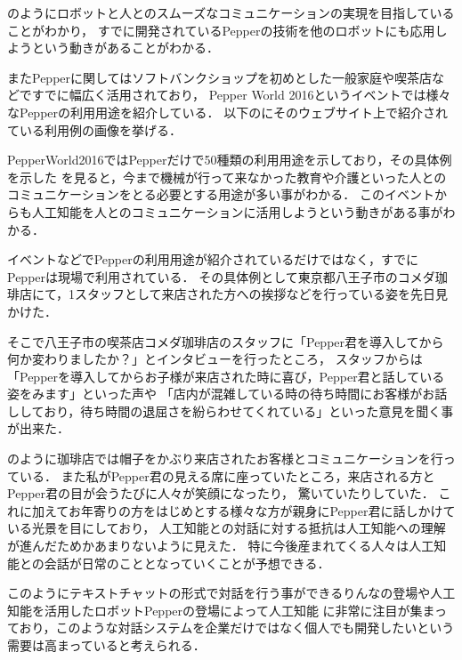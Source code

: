 
のようにロボットと人とのスムーズなコミュニケーションの実現を目指していることがわかり，
すでに開発されているPepperの技術を他のロボットにも応用しようという動きがあることがわかる．

またPepperに関してはソフトバンクショップを初めとした一般家庭や喫茶店などですでに幅広く活用されており，
Pepper World 2016\cite{Pepper2}というイベントでは様々なPepperの利用用途を紹介している．
以下のにそのウェブサイト上で紹介されている利用例の画像を挙げる．


PepperWorld2016ではPepperだけで50種類の利用用途を示しており，その具体例を示した
を見ると，今まで機械が行って来なかった教育や介護といった人とのコミュニケーションをとる必要とする用途が多い事がわかる．
このイベントからも人工知能を人とのコミュニケーションに活用しようという動きがある事がわかる．

イベントなどでPepperの利用用途が紹介されているだけではなく，すでにPepperは現場で利用されている．
その具体例として東京都八王子市のコメダ珈琲店\cite{coffe}にて，1スタッフとして来店された方への挨拶などを行っている姿を先日見かけた．

そこで八王子市の喫茶店コメダ珈琲店のスタッフに「Pepper君を導入してから何か変わりましたか？」とインタビューを行ったところ，
スタッフからは「Pepperを導入してからお子様が来店された時に喜び，Pepper君と話している姿をみます」といった声や
「店内が混雑している時の待ち時間にお客様がお話ししており，待ち時間の退屈さを紛らわせてくれている」といった意見を聞く事が出来た．


のように珈琲店では帽子をかぶり来店されたお客様とコミュニケーションを行っている．
また私がPepper君の見える席に座っていたところ，来店される方とPepper君の目が会うたびに人々が笑顔になったり，
驚いていたりしていた．
これに加えてお年寄りの方をはじめとする様々な方が親身にPepper君に話しかけている光景を目にしており，
人工知能との対話に対する抵抗は人工知能への理解が進んだためかあまりないように見えた．
特に今後産まれてくる人々は人工知能との会話が日常のこととなっていくことが予想できる．

このようにテキストチャットの形式で対話を行う事ができるりんなの登場や人工知能を活用したロボットPepperの登場によって人工知能
に非常に注目が集まっており，このような対話システムを企業だけではなく個人でも開発したいという需要は高まっていると考えられる．

